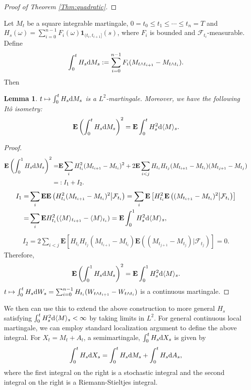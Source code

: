 \documentclass[twoside, 12pt]{book}
\numberwithin{equation}{chapter}
\newtheorem{lemma}[theorem]{Lemma}
\def\cF{{\mathcal F}}
\def\bE{{\mathbf E}}
\def\l{\left}
\def\r{\right}
\def\<{\langle}
\def\>{\rangle}
\def\leq{\leqslant}
\def\1{{\mathbf{1}}}
\def\d{\text{\rm{d}}}
\begin{document}
	\begin{proof}[Proof of Theorem \ref{Thm:quadratic}]
		
	\end{proof}
	Let $M_t$ be a square integrable martingale, $0=t_0\leq t_1\leq \cdots \leq t_{n}=T$ and $H_s(\omega) = \sum_{i=0}^{n-1} F_i(\omega)\1_{(t_{i},t_{i+1}]}(s)$, where $F_i$ is bounded and $\cF_{t_i}$-measurable. Define 
	\[
	\int_0^t H_s \d M_s:= \sum_{i=0}^{n-1} F_i (M_{t\wedge t_{i+1}}-M_{t\wedge t_{i}}). 
	\]
	Then 
	\begin{lemma}
		$t\mapsto \int_0^t H_s \d M_s$ is a $L^2$-martingale. Moreover, we have the following It\^o isometry:  
		\begin{equation}
			\bE \l(\int_0^t H_s \d M_s \r)^2 = \bE \int_0^t H_s^2 \d \<M\>_s. 
		\end{equation}
	\end{lemma}
	\begin{proof}
		\begin{align*}
			\bE \l(\int_0^1 H_s \d M_s\r)^2=& \bE \sum_{i} H_{t_i}^2 (M_{t_{i+1}}-M_{t_i})^2 + 2\bE \sum_{i<j} H_{t_i}H_{t_j}(M_{t_{i+1}}-M_{t_i})(M_{t_{j+1}}-M_{t_j}) \\
			=&: I_1+ I_2. 
		\end{align*}
		\begin{align*}
			\begin{aligned}
				I_1=&\sum_{i} \bE \bE \l(H_{t_i}^2 (M_{t_{i+1}}-M_{t_i})^2\big|\cF_{t_i}\r)= \sum_{i} \bE \l[ H_{t_i}^2 \bE\l( (M_{t_{i+1}}-M_{t_i})^2\big|\cF_{t_i}\r) \r] \\
				=&\sum_{i}  \bE H_{t_i}^2 (\<M\>_{t_{i+1}}-\<M\>_{t_{i}})= \bE  \int_0^1 H^2_s \d \<M\>_s ,
			\end{aligned}
		\end{align*}
		\begin{align*}
			I_2= 2\sum_{i<j} \bE \l[  H_{t_i}H_{t_j}(M_{t_{i+1}}-M_{t_i}) \bE \l( (M_{t_{j+1}}-M_{t_j}) \big|\cF_{t_j}\r) \r]=0. 
		\end{align*}
		Therefore, 
		\begin{equation*}
			\bE \l(\int_0^1 H_s \d M_s\r)^2=  \bE  \int_0^1 H^2_s \d \<M\>_s. 
		\end{equation*}
		$t\mapsto \int_0^t H_s \d W_s=  \sum_{i=0}^{n-1} H_{t_i}(W_{t\wedge t_{i+1}}-W_{t\wedge t_i})$ is a continuous martingale. 
	\end{proof}
	
	We then can use this to extend the above construction to more general $H_s$ satisfying $\int_0^t H_s^2 \d \langle M \rangle_s<\infty$ by taking limits in $L^2$. For general continuous local martingale, we can employ standard localization argument to define the above integral. For $X_t=M_t+A_t$, a semimartingale, $\int_0^t H_s \d X_s$ is given by
	$$
	\int_0^t H_s \d X_s=\int_0^t H_s \d M_s+\int_0^t H_s \d A_s, 
	$$
	where the first integral on the right is a stochastic integral and the second integral on the right is a Riemann-Stieltjes integral.
	
\end{document}
